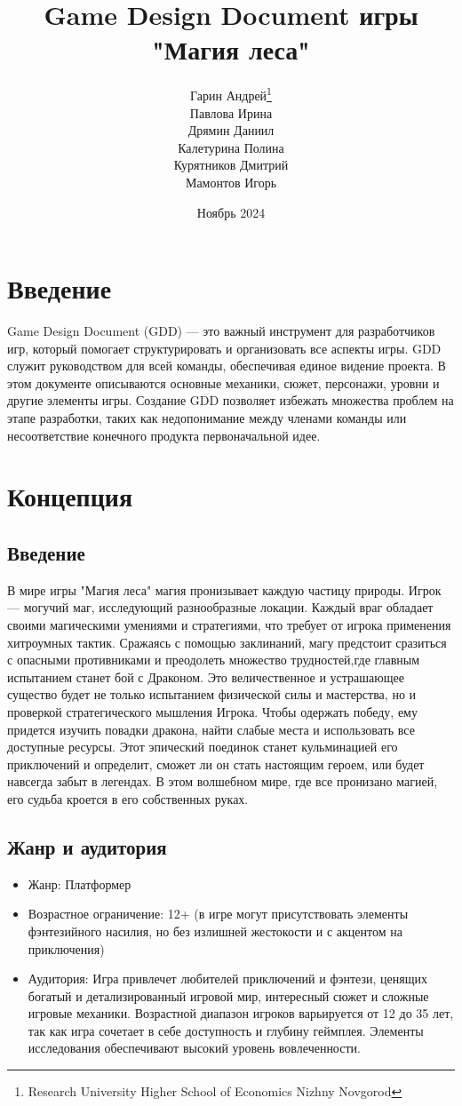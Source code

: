 \documentclass{article}
\title{Game Design Document игры "Магия леса"}
\author{
Гарин Андрей\footnote{Research University Higher School of Economics Nizhny Novgorod} \\
Павлова Ирина \\
Дрямин Даниил \\
Калетурина Полина \\
Курятников Дмитрий \\
Мамонтов Игорь
}
\date{Ноябрь 2024}
\begin{document}
\maketitle

\tableofcontents
\newpage

\section{Введение}

Game Design Document (GDD) — это важный инструмент для разработчиков
игр, который помогает структурировать и организовать все аспекты игры.
GDD служит руководством для всей команды, обеспечивая единое видение
проекта. В этом документе описываются основные механики, сюжет, персонажи,
уровни и другие элементы игры. Создание GDD позволяет избежать множества
проблем на этапе разработки, таких как недопонимание между членами
команды или несоответствие конечного продукта первоначальной идее.

\section{Концепция}
\subsection{Введение}
В мире игры "Магия леса" магия пронизывает каждую частицу природы.
Игрок — могучий маг, исследующий разнообразные
локации. Каждый враг обладает своими магическими умениями и стратегиями,
что требует от игрока применения хитроумных тактик.
Сражаясь с помощью заклинаний, магу предстоит
сразиться с опасными противниками и преодолеть множество трудностей,где
главным испытанием станет бой с Драконом. Это величественное и устрашающее
существо будет не только испытанием физической силы и мастерства, но
и проверкой стратегического мышления Игрока. Чтобы одержать победу,
ему придется изучить повадки дракона, найти слабые места и использовать
все доступные ресурсы. Этот эпический
поединок станет кульминацией его приключений и определит, сможет ли он
стать настоящим героем, или будет навсегда забыт в легендах.
В этом волшебном мире, где все пронизано магией, его судьба кроется в его собственных руках.


\subsection{Жанр и аудитория}
\begin{itemize}
    \item Жанр: 
    Платформер
    \item Возрастное ограничение:
    12+ (в игре могут присутствовать элементы фэнтезийного насилия, но без излишней жестокости и с акцентом на приключения)
    \item Аудитория:
    Игра привлечет любителей приключений и фэнтези, ценящих богатый и детализированный игровой мир, интересный сюжет и сложные игровые механики. Возрастной диапазон игроков варьируется от 12 до 35 лет, так как игра сочетает в себе доступность и глубину геймплея. Элементы исследования обеспечивают высокий уровень вовлеченности.
\end{itemize}
\end{document}
